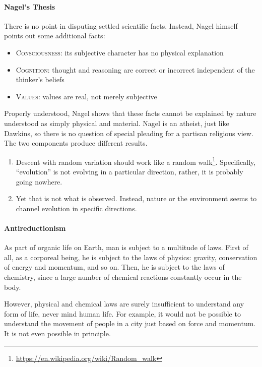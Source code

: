 \paragraph{Nagel's Thesis}
There is no point in disputing settled scientific facts. Instead, Nagel himself points out some additional facts:

\begin{itemize}
\item \textsc{Consciousness}: its subjective character has no physical explanation 
\item \textsc{Cognition}: thought and reasoning are correct or incorrect independent of the thinker's
beliefs 
\item \textsc{Values}: values are real, not merely subjective 
\end{itemize}

Properly understood, Nagel shows that these facts cannot be explained by nature understood as simply physical and
material. Nagel is an atheist, just like Dawkins, so there is no question of special pleading for a partisan religious
view. The two components produce different results.

\begin{enumerate}
\item Descent with random variation should work like a random walk\footnote{\url{https://en.wikipedia.org/wiki/Random_walk}}. Specifically, “evolution” is not evolving in a
particular direction, rather, it is probably going nowhere. 
\item Yet that is not what is observed. Instead, nature or the environment seems to channel evolution in specific
directions. 
\end{enumerate}

\paragraph{Antireductionism}
As part of organic life on Earth, man is subject to a multitude of laws. First of all, as a corporeal being, he is
subject to the laws of physics: gravity, conservation of energy and momentum, and so on. Then, he is subject to the
laws of chemistry, since a large number of chemical reactions constantly occur in the body.

However, physical and chemical laws are surely insufficient to understand any form of life, never mind human life. For
example, it would not be possible to understand the movement of people in a city just based on force and momentum. It
is not even possible in principle.

